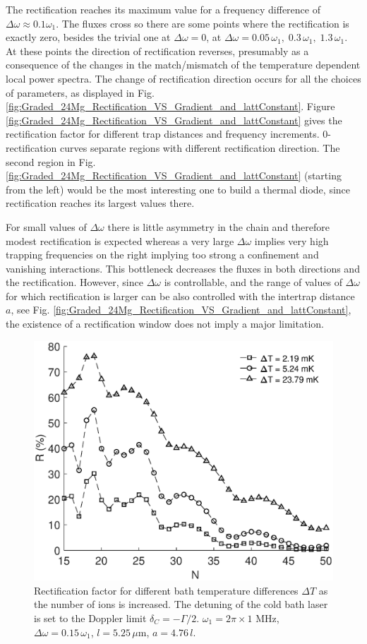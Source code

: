 The rectification reaches its maximum value for a frequency difference of $\Delta\omega \approx 0.1 \omega_1$. The fluxes cross so there are some points where the rectification is exactly zero, besides the trivial one at $\Delta\omega = 0$, at $\Delta\omega = 0.05\,\omega_1,\;0.3\,\omega_1,\;1.3\,\omega_1$. At these points the direction of rectification reverses, presumably as a consequence of the changes in the match/mismatch of the temperature dependent local power spectra.
The change of rectification direction occurs for all the choices of parameters, as displayed in Fig. \ref{fig:Graded_24Mg_Rectification_VS_Gradient_and_lattConstant}. Figure \ref{fig:Graded_24Mg_Rectification_VS_Gradient_and_lattConstant} gives the rectification factor for different trap distances and frequency increments.  $0$-rectification curves separate regions with different rectification direction. The second region in Fig. \ref{fig:Graded_24Mg_Rectification_VS_Gradient_and_lattConstant} (starting from the left) would be the most interesting one to build a thermal diode, since rectification reaches its largest values there.

{For small values of $\Delta \omega$ there is little asymmetry in the chain and therefore modest rectification is expected whereas a very large $\Delta \omega$ implies very high trapping frequencies on the right implying too strong a
confinement and vanishing interactions. This bottleneck decreases the fluxes in both directions and  the rectification. However, since $\Delta \omega$ is controllable,
and the range of values of $\Delta \omega$ for which rectification is larger can be also controlled with the intertrap distance $a$, see Fig. \ref{fig:Graded_24Mg_Rectification_VS_Gradient_and_lattConstant},
the existence of a rectification window
does not imply a major limitation.}

\begin{figure}
  \center
  \includegraphics[width=0.75\linewidth]{Figures/Changing_N.eps}
  \caption{Rectification factor for different bath temperature differences $\Delta T$ as the number of ions is increased. The detuning of the cold bath laser is set to the Doppler limit $\delta_C = - \Gamma / 2$. $\omega_1 = 2 \pi \times 1$ MHz, $\Delta \omega = 0.15 \, \omega_1$, $l = 5.25\,\mu$m, $a = 4.76 \, l$.}
  \label{fig:N_Dependence}
\end{figure}
%
%
